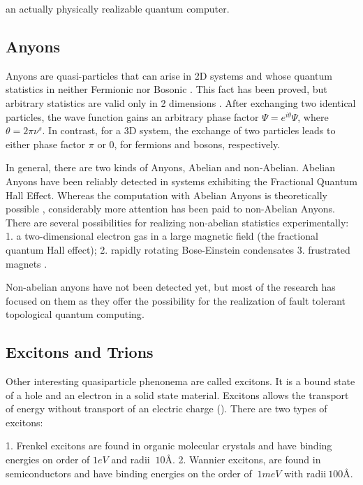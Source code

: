 an actually physically realizable quantum computer\cite{Tqc2,Tqc3}. 


\subsection*{Anyons}
Anyons are quasi-particles that can arise in 2D systems and whose quantum statistics in neither Fermionic nor Bosonic \cite{Anyons1}.  This fact has been proved\cite{Anyons2}, but
arbitrary statistics are valid only in 2 dimensions \cite{Walsh}. After exchanging two identical particles, the wave function gains an arbitrary phase factor $ \Psi = e^{i\theta}\Psi $, where $ \theta = 2\pi\nu^{s} $. In contrast, for a 3D system, the exchange of two particles leads to either phase factor $ \pi $ or $ 0 $, for fermions and bosons, respectively.

In general, there are two kinds of Anyons, Abelian and non-Abelian. Abelian Anyons have been reliably detected in systems exhibiting the Fractional Quantum Hall Effect\cite{FQHE}.  Whereas the computation with Abelian Anyons is theoretically possible \cite{AbelianAnyons}, considerably more attention has been paid to non-Abelian Anyons.
There are several possibilities for realizing non-abelian statistics experimentally: 1. a two-dimensional electron gas in a large magnetic field (the fractional quantum Hall effect); 2. rapidly rotating Bose-Einstein condensates\cite{RrBeC} 3. frustrated magnets \cite{FrMag}.

Non-abelian anyons have not been detected yet, but most of the research has focused on them as they offer the possibility 
for the realization of fault tolerant topological quantum computing\cite{AnyonsTqc}. 


\subsection*{Excitons and Trions}
Other interesting quasiparticle phenonema are called excitons\cite{Excitons2D1}. It is a bound state of a hole and an electron in a solid state material. Excitons allows the transport of energy without transport of an electric charge (). There are two types of excitons: 

1. Frenkel excitons are found in organic molecular crystals\cite{Excitons3} and have binding energies on
order of $ 1eV $ and radii $ ~ 10\text{\AA} $.  
2. Wannier excitons, are found in semiconductors\cite{Excitons2} and have binding energies on the order of $ ~1 meV $ with radii$ ~100\text{\AA}. $

